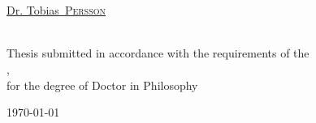 \begin{titlepage}
\begin{center}
\begin{minipage}[t]{0.4\textwidth}
\begin{flushleft} \large
{}\\
\href{https://orcid.org/my-orcid?orcid=0000-0001-8012-1440}{\authorname} %
\end{flushleft}
\end{minipage}
\begin{minipage}[t]{0.4\textwidth}
\begin{flushright} \large
{}\\
\href{https://www.researchgate.net/profile/Tobias-Persson}{Dr. Tobias~\textsc{Persson}}\\
\href{https://orcid.org/0000-0001-7085-0973}{\supname}\\
\end{flushright}
\end{minipage}

\vspace{1.5cm}

\vfill

\large {Thesis submitted in accordance with the requirements of the\\}
\univname, \deptname \\
\large {for the degree of Doctor in Philosophy}

\vfill

{\large \today}\\[4.5cm] %

\vfill
\end{center}
\end{titlepage}